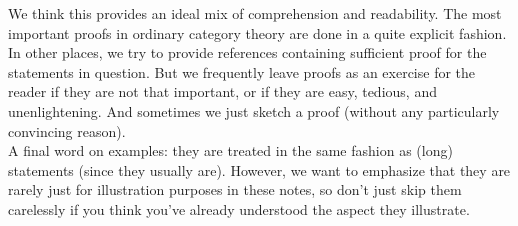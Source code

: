 We think this provides an ideal mix of comprehension and readability.
The most important proofs in ordinary category theory are done in a quite explicit fashion.
In other places, we try to provide references containing sufficient proof for the statements in question.
But we frequently leave proofs as an exercise for the reader if they are not that important, or if they are easy, tedious, and unenlightening.
And sometimes we just sketch a proof (without any particularly convincing reason).
\\
A final word on examples: they are treated in the same fashion as (long) statements (since they usually are).
However, we want to emphasize that they are rarely just for illustration purposes in these notes, so don't just skip them carelessly if you think you've already understood the aspect they illustrate.
